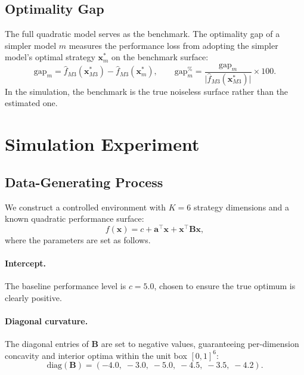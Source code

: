 \documentclass[12pt]{article}
\newcommand{\bx}{\mathbf{x}}
\newcommand{\bB}{\mathbf{B}}
\newcommand{\ba}{\mathbf{a}}
\begin{document}
\subsection{Optimality Gap}

The full quadratic model serves as the benchmark. The optimality gap of a simpler model $m$ measures the performance loss from adopting the simpler model's optimal strategy $\bx^*_m$ on the benchmark surface:
\begin{equation}
    \text{gap}_m = \hat{f}_{M3}(\bx^*_{M3}) - \hat{f}_{M3}(\bx^*_m), \qquad
    \text{gap}_m^{\%} = \frac{\text{gap}_m}{\bigl|\hat{f}_{M3}(\bx^*_{M3})\bigr|} \times 100.
    \label{eq:gap}
\end{equation}
In the simulation, the benchmark is the true noiseless surface rather than the estimated one.


\section{Simulation Experiment}
\label{sec:simulation}

\subsection{Data-Generating Process}
\label{sec:sim_dgp}

We construct a controlled environment with $K = 6$ strategy dimensions and a known quadratic performance surface:
\begin{equation}
    f(\bx) = c + \ba^\top \bx + \bx^\top \bB \bx,
    \label{eq:true_surface}
\end{equation}
where the parameters are set as follows.

\paragraph{Intercept.} The baseline performance level is $c = 5.0$, chosen to ensure the true optimum is clearly positive.

\paragraph{Diagonal curvature.} The diagonal entries of $\bB$ are set to negative values, guaranteeing per-dimension concavity and interior optima within the unit box $[0, 1]^6$:
\begin{equation}
    \text{diag}(\bB) = (-4.0, \; -3.0, \; -5.0, \; -4.5, \; -3.5, \; -4.2).
\end{equation}
\end{document}
